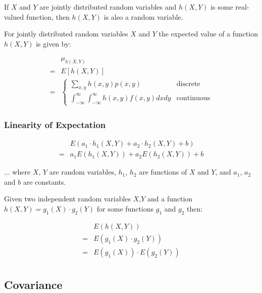 If $X$ and $Y$ are jointly distributed random variables and $h(X,Y)$ is some real-valued function, then $h(X,Y)$ is also a random variable.

For jointly distributed random variables $X$ and $Y$ the expected value of a function $h(X,Y)$ is given by:

\begin{align*}
    & \mu_{h(X,Y)}                                                                                                                                                    \\
  = & E[h(X,Y)]                                                                                                                                                       \\
  = & \begin{cases} \sum_{x,y} h(x,y) p(x,y) & \text{discrete} \\ \int_{-\infty}^{\infty} \int_{-\infty}^{\infty} h(x,y) f(x,y) dx dy & \text{continuous} \end{cases}
\end{align*}

\subsubsection*{Linearity of Expectation}

\begin{align*}
    & E(a_1\cdot h_1(X,Y) + a_2\cdot h_2(X,Y) + b) \\
  = & a_1 E(h_1(X,Y)) + a_2 E(h_2(X,Y)) + b
\end{align*}

... where $X$, $Y$ are random variables, $h_1$, $h_2$ are functions of $X$ and $Y$, and $a_1$, $a_2$ and $b$ are constants.

Given two independent random variables $X$,$Y$ and a function $h(X,Y)=g_1(X)\cdot g_2(Y)$ for some functions $g_1$ and $g_2$ then:

\begin{align*}
    & E(h(X,Y))                 \\
  = & E(g_1(X)\cdot g_2(Y))     \\
  = & E(g_1(X)) \cdot E(g_2(Y)) \\
\end{align*}

\subsection*{Covariance}

